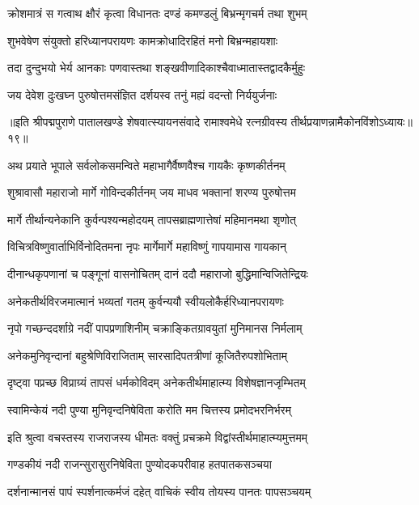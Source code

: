 \twolineshloka
{क्रोशमात्रं स गत्वाथ क्षौरं कृत्वा विधानतः}
{दण्डं कमण्डलुं बिभ्रन्मृगचर्म तथा शुभम्}%

\twolineshloka
{शुभवेषेण संयुक्तो हरिध्यानपरायणः}
{कामक्रोधादिरहितं मनो बिभ्रन्महायशाः}%

\twolineshloka
{तदा दुन्दुभयो भेर्य आनकाः पणवास्तथा}
{शङ्खवीणादिकाश्चैवाध्मातास्तद्वादकैर्मुहुः}%

\twolineshloka
{जय देवेश दुःखघ्न पुरुषोत्तमसंज्ञित}
{दर्शयस्व तनुं मह्यं वदन्तो निर्ययुर्जनाः}%

{॥इति श्रीपद्मपुराणे पातालखण्डे शेषवात्स्यायनसंवादे रामाश्वमेधे रत्नग्रीवस्य तीर्थप्रयाणन्नामैकोनविंशोऽध्यायः॥१९॥}



\twolineshloka
{अथ प्रयाते भूपाले सर्वलोकसमन्विते}
{महाभागैर्वैष्णवैश्च गायकैः कृष्णकीर्तनम्}%

\twolineshloka
{शुश्रावासौ महाराजो मार्गे गोविन्दकीर्तनम्}
{जय माधव भक्तानां शरण्य पुरुषोत्तम}%

\twolineshloka
{मार्गे तीर्थान्यनेकानि कुर्वन्पश्यन्महोदयम्}
{तापसब्राह्मणात्तेषां महिमानमथा शृणोत्}%

\twolineshloka
{विचित्रविष्णुवार्ताभिर्विनोदितमना नृपः}
{मार्गेमार्गे महाविष्णुं गापयामास गायकान्}%

\twolineshloka
{दीनान्धकृपणानां च पङ्गूनां वासनोचितम्}
{दानं ददौ महाराजो बुद्धिमान्विजितेन्द्रियः}%

\twolineshloka
{अनेकतीर्थविरजमात्मानं भव्यतां गतम्}
{कुर्वन्ययौ स्वीयलोकैर्हरिध्यानपरायणः}%

\twolineshloka
{नृपो गच्छन्ददर्शाग्रे नदीं पापप्रणाशिनीम्}
{चक्राङ्कितग्रावयुतां मुनिमानस निर्मलाम्}%

\twolineshloka
{अनेकमुनिवृन्दानां बहुश्रेणिविराजिताम्}
{सारसादिपतत्रीणां कूजितैरुपशोभिताम्}%

\twolineshloka
{दृष्ट्वा पप्रच्छ विप्राग्र्यं तापसं धर्मकोविदम्}
{अनेकतीर्थमाहात्म्य विशेषज्ञानजृम्भितम्}%

\twolineshloka
{स्वामिन्केयं नदी पुण्या मुनिवृन्दनिषेविता}
{करोति मम चित्तस्य प्रमोदभरनिर्भरम्}%

\twolineshloka
{इति श्रुत्वा वचस्तस्य राजराजस्य धीमतः}
{वक्तुं प्रचक्रमे विद्वांस्तीर्थमाहात्म्यमुत्तमम्}%


\twolineshloka
{गण्डकीयं नदी राजन्सुरासुरनिषेविता}
{पुण्योदकपरीवाह हतपातकसञ्चया}%

\twolineshloka
{दर्शनान्मानसं पापं स्पर्शनात्कर्मजं दहेत्}
{वाचिकं स्वीय तोयस्य पानतः पापसञ्चयम्}%

